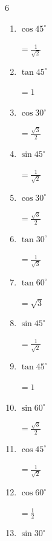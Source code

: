 \begin{multicols}{6}
\begin{enumerate}
        $\displaystyle =\frac{1}{\sqrt{3}}$

  \item $\displaystyle \cos{45^\circ}$

        $\displaystyle =\frac{1}{\sqrt{2}}$

  \item $\displaystyle \tan{45^\circ}$

        $\displaystyle =1$

  \item $\displaystyle \cos{30^\circ}$

        $\displaystyle =\frac{\sqrt{3}}{2}$

  \item $\displaystyle \sin{45^\circ}$

        $\displaystyle =\frac{1}{\sqrt{2}}$

\columnbreak %

  \item $\displaystyle \cos{30^\circ}$

        $\displaystyle =\frac{\sqrt{3}}{2}$

  \item $\displaystyle \tan{30^\circ}$

        $\displaystyle =\frac{1}{\sqrt{3}}$

  \item $\displaystyle \tan{60^\circ}$

        $\displaystyle =\sqrt{3}$

  \item $\displaystyle \sin{45^\circ}$

        $\displaystyle =\frac{1}{\sqrt{2}}$

  \item $\displaystyle \tan{45^\circ}$

        $\displaystyle =1$

  \item $\displaystyle \sin{60^\circ}$

        $\displaystyle =\frac{\sqrt{3}}{2}$

  \item $\displaystyle \cos{45^\circ}$

        $\displaystyle =\frac{1}{\sqrt{2}}$

  \item $\displaystyle \cos{60^\circ}$

        $\displaystyle =\frac{1}{2}$

  \item $\displaystyle \sin{30^\circ}$


\end{enumerate}
\end{multicols}
